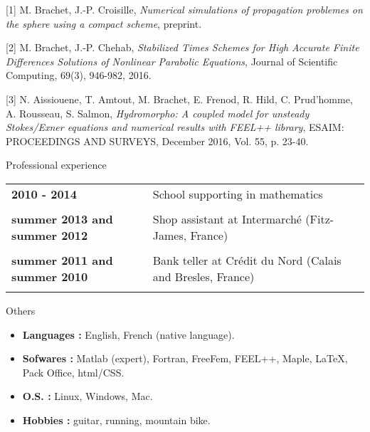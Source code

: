 \documentclass[10pt,a4paper]{report}
\begin{document}
[1] {\sc  M. Brachet, J.-P. Croisille}, {\sl Numerical simulations of propagation problemes on the sphere using a compact scheme}, preprint.

\vspace{0.6cm}

[2] {\sc M. Brachet, J.-P. Chehab}, {\sl Stabilized Times Schemes for High Accurate Finite Differences Solutions of Nonlinear Parabolic Equations}, Journal of Scientific Computing, 69(3), 946-982, 2016.

\vspace{0.6cm}

[3] {\sc  N. Aissiouene, T. Amtout, M. Brachet, E. Frenod, R. Hild, C. Prud'homme, A. Rousseau, S. Salmon}, {\sl  Hydromorpho: A coupled model for unsteady Stokes/Exner equations and numerical results with FEEL++ library}, ESAIM: PROCEEDINGS AND SURVEYS, December 2016, Vol. 55, p. 23-40.






\vspace{1cm}
\noindent
{\selectfont
\begin{Large}
Professional experience
\end{Large}
\hrulefill
}

\vspace{0.6cm}
\noindent
\begin{center}
\begin{tabular}{p{5cm} p{10cm}}
\textbf{2010 - 2014} & School supporting in mathematics\\

& \\

\textbf{summer 2013 and summer 2012} & Shop assistant at Intermarché (Fitz-James, France) \\

& \\

\textbf{summer 2011 and summer 2010} & Bank teller at Crédit du Nord (Calais and Bresles, France) \\

& \\

\end{tabular}
\end{center}


\vspace{0.6cm}
\noindent
{\selectfont
\begin{Large}
Others
\end{Large}
\hrulefill
}

\vspace{1cm}
\noindent
\begin{itemize}
\item \textbf{Languages :} English, French (native language).
\item \textbf{Sofwares :} Matlab (expert), Fortran, FreeFem, FEEL++, Maple, \LaTeX, Pack Office, html/CSS.
\item \textbf{O.S. :} Linux, Windows, Mac.
\item \textbf{Hobbies :} guitar, running, mountain bike.

\end{itemize}
\end{document}
